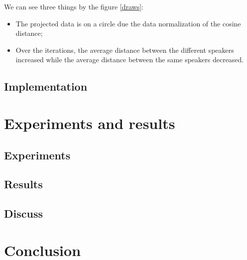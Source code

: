 \documentclass{techrep} %
\begin{document}
 We can see three things by the figure \ref{draws}:
\begin{itemize}
\item The projected data is on a circle due the data normalization of the cosine distance;
\item Over the iterations, the average distance between the different
  speakers increased while the average distance between the same
  speakers decreased.
\end{itemize}

\section{Implementation}

\chapter{Experiments and results}
\section{Experiments}
\section{Results}
\section{Discuss}
\chapter*{Conclusion}

 \nocite{*}
\end{document}
